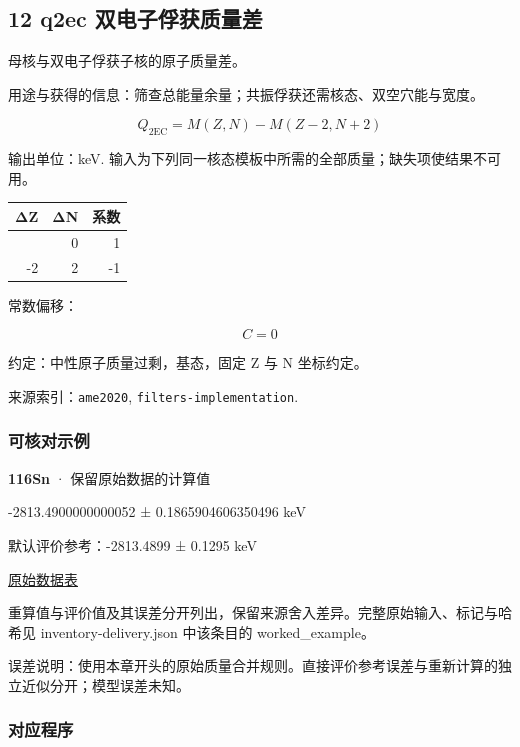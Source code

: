 \documentclass[
  11pt,
  letterpaper,
]{article}
\begin{document}
\subsection{12 q2ec
双电子俘获质量差}\label{q2ec-ux53ccux7535ux5b50ux4fd8ux83b7ux8d28ux91cfux5dee}

母核与双电子俘获子核的原子质量差。

用途与获得的信息：筛查总能量余量；共振俘获还需核态、双空穴能与宽度。

\[
Q_{2{\mathrm{EC}}}=M(Z,N)-M(Z-2,N+2)
\]

输出单位：keV.
输入为下列同一核态模板中所需的全部质量；缺失项使结果不可用。

\begin{longtable}[]{@{}rrr@{}}
\toprule\noalign{}
ΔZ & ΔN & 系数 \\
\midrule\noalign{}
\endhead
\bottomrule\noalign{}
\endlastfoot
0 & 0 & 1 \\
-2 & 2 & -1 \\
\end{longtable}

常数偏移：

\[
C=0
\]

约定：中性原子质量过剩，基态，固定 Z 与 N 坐标约定。

来源索引：\texttt{ame2020}, \texttt{filters-implementation}.

\subsubsection{可核对示例}\label{ux53efux6838ux5bf9ux793aux4f8b-11}

\textbf{116Sn} · 保留原始数据的计算值

-2813.4900000000052 ± 0.1865904606350496 keV

默认评价参考：-2813.4899 ± 0.1295 keV

\href{https://www-nds.iaea.org/amdc/ame2020/rct1.mas20.txt}{原始数据表}

重算值与评价值及其误差分开列出，保留来源舍入差异。完整原始输入、标记与哈希见
inventory-delivery.json 中该条目的 worked\_example。

误差说明：使用本章开头的原始质量合并规则。直接评价参考误差与重新计算的独立近似分开；模型误差未知。

\subsubsection{对应程序}\label{ux5bf9ux5e94ux7a0bux5e8f-11}
\end{document}
